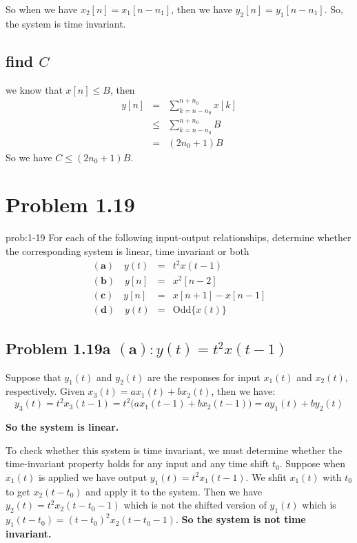 \documentclass[koma,a4paper,utopia,12pt,listings-color,microtype,paralist,colorlinks,urlcolor=red]{org-article}
\begin{document}
So when we have \(x_{2}[n] = x_{1}[n- n_{1}]\), then we have \(y_{2}[n] =
y_{1}[n- n_{1}]\). So, the system is time invariant.

\subsection{find \(C\)}
\label{sec:org7bac5ad}

we know that \(x[n] \leq B\), then
\begin{eqnarray*}
y[n] &=& \sum_{k=n-n_{0}}^{n+n_{0}} x[k] \\
&\leq &  \sum_{k=n-n_{0}}^{n+n_{0}} B \\
&=& ( 2n_{0} + 1 ) B
\end{eqnarray*}
So we have \(C \leq ( 2n_{0} +1 )B\).
\section{Problem 1.19}
\label{sec:orgd18fdbd}


\begin{prob}[]{prob:1-19}
For each of the following input-output relationships, determine whether
the corresponding system is linear, time invariant or both
\begin{eqnarray*}
\mathbf{(a)}\quad y(t)&=& t^{2} x(t-1) \\
\mathbf{(b)}\quad y[n]&=& x^{2}[n-2] \\
\mathbf{(c)}\quad y[n]&=& x[n+1] - x[n-1] \\
\mathbf{(d)}\quad y( t )&=& \mathrm{Odd}\{ x(t) \}
\end{eqnarray*}
\label{prob:1-19}
\end{prob}

\subsection{Problem 1.19a  \(\mathbf{(a)}: y(t)= t^{2} x(t-1)\)}
\label{sec:org87ea096}

Suppose that \(y_{1}(t)\) and \(y_{2}(t)\) are the responses for input
\(x_{1}(t)\) and \(x_{2}(t)\), respectively. Given \(x_{3}(t) = ax_{1}(t) +
bx_{2}(t)\), then we have:
\begin{equation*}
  y_{3}(t) = t^{2}x_{3}(t-1) = t^{2} \Big( ax_{1}(t-1) + bx_{2}(t-1) \Big) = ay_{1}(t) + by_{2}(t)
\end{equation*}

\textbf{So the system is linear.}

 To check whether this system is time invariant, we must
determine whether the time-invariant property holds for any input and any time
shift \(t_{0}\). Suppose when \(x_{1}(t)\) is applied we have output \(y_{1}(t)
= t^{2}x_{1}(t-1)\). We shfit \(x_{1}(t)\) with \(t_{0}\) to get
\(x_{2}(t-t_{0})\) and apply it to the system. Then we have \(y_{2}(t) =
t^{2}x_{2}(t-t_{0}-1)\) which is not the shifted version of \(y_{1}(t)\) which
is \(y_{1}(t-t_{0}) = (t-t_{0})^{2} x_{2}(t-t_{0}-1)\).  \textbf{So the system is not time invariant.}
\end{document}
